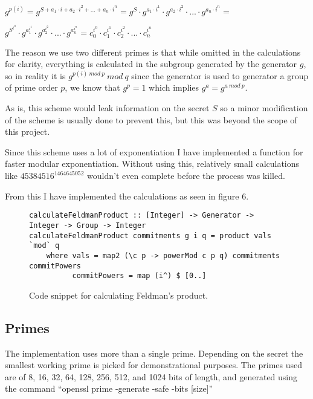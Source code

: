 \documentclass[a4paper,oneside,12pt,final]{article}
\begin{document}
$g^{p(i)} = g^{S + a_1\cdot i + a_2 \cdot i^2 + ... + a_n \cdot i^n} = 
g^{S}\cdot g^{a_1 \cdot {i^1}} \cdot g^{a_2 \cdot {i^2}} \cdot ... \cdot g^{a_n
\cdot {i^n}} = $

$
g^{S^{i^0}}\cdot g^{a_1^{i^1}} \cdot g^{a_2^{i^2}} \cdot ... \cdot g^{a_n^{i^n}} = 
c_0^{i^0}\cdot c_1^{i^1} \cdot c_2^{i^2} \cdot ... \cdot c_n^{i^n}$

The reason we use two different primes is that while omitted in the calculations
for clarity, everything is calculated in the subgroup generated by the generator
$g$, so in reality it is $g^{p(i)\ mod\ p}\ mod\ q$ since the generator is used
to generator a group of prime order $p$, we know that $g^p = 1$ which implies
$g^a = g^{a\ mod\ p}$.

As is, this scheme would leak information on the secret $S$ so a minor
modification of the scheme is usually done to prevent this, but this was beyond
the scope of this project.

Since this scheme uses a lot of exponentiation I have implemented a function for
faster modular exponentiation. Without using this, relatively small calculations
like $45384516^{1464645052}$ wouldn't even complete before the process was
killed.

From this I have implemented the calculations as seen in figure 6.

\begin{figure}[h]
\label{fig:calculate-feldman}
\begin{verbatim}
calculateFeldmanProduct :: [Integer] -> Generator -> Integer -> Group -> Integer
calculateFeldmanProduct commitments g i q = product vals `mod` q
    where vals = map2 (\c p -> powerMod c p q) commitments commitPowers
          commitPowers = map (i^) $ [0..]
\end{verbatim}
\caption{Code snippet for calculating Feldman's product.}
\end{figure}


\subsection{Primes}

The implementation uses more than a single prime. Depending on the secret the
smallest working prime is picked for demonstrational purposes. The primes used
are of 8, 16, 32, 64, 128, 256, 512, and 1024 bits of length, and generated
using the command ``openssl prime -generate -safe -bits [size]''
\end{document}
